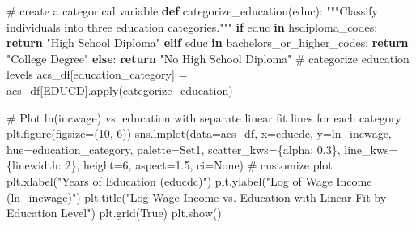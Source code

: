 \documentclass[
  letterpaper,
  DIV=11,
  numbers=noendperiod]{scrartcl}
\newenvironment{Shaded}{\begin{snugshade}}{\end{snugshade}}
\newcommand{\BuiltInTok}[1]{\textcolor[rgb]{0.00,0.23,0.31}{#1}}
\newcommand{\CommentTok}[1]{\textcolor[rgb]{0.37,0.37,0.37}{#1}}
\newcommand{\ControlFlowTok}[1]{\textcolor[rgb]{0.00,0.23,0.31}{\textbf{#1}}}
\newcommand{\DecValTok}[1]{\textcolor[rgb]{0.68,0.00,0.00}{#1}}
\newcommand{\FloatTok}[1]{\textcolor[rgb]{0.68,0.00,0.00}{#1}}
\newcommand{\KeywordTok}[1]{\textcolor[rgb]{0.00,0.23,0.31}{\textbf{#1}}}
\newcommand{\NormalTok}[1]{\textcolor[rgb]{0.00,0.23,0.31}{#1}}
\newcommand{\OperatorTok}[1]{\textcolor[rgb]{0.37,0.37,0.37}{#1}}
\newcommand{\StringTok}[1]{\textcolor[rgb]{0.13,0.47,0.30}{#1}}
\newcommand{\VariableTok}[1]{\textcolor[rgb]{0.07,0.07,0.07}{#1}}
\begin{document}
\begin{Shaded}
\begin{Highlighting}[]
\CommentTok{\# create a categorical variable}
\KeywordTok{def}\NormalTok{ categorize\_education(educ):}
    \CommentTok{"""Classify individuals into three education categories."""}
    \ControlFlowTok{if}\NormalTok{ educ }\KeywordTok{in}\NormalTok{ hsdiploma\_codes:}
        \ControlFlowTok{return} \StringTok{"High School Diploma"}
    \ControlFlowTok{elif}\NormalTok{ educ }\KeywordTok{in}\NormalTok{ bachelors\_or\_higher\_codes:}
        \ControlFlowTok{return} \StringTok{"College Degree"}
    \ControlFlowTok{else}\NormalTok{:}
        \ControlFlowTok{return} \StringTok{"No High School Diploma"}
\CommentTok{\# categorize education levels}
\NormalTok{acs\_df[}\StringTok{\textquotesingle{}education\_category\textquotesingle{}}\NormalTok{] }\OperatorTok{=}\NormalTok{ acs\_df[}\StringTok{\textquotesingle{}EDUCD\textquotesingle{}}\NormalTok{].}\BuiltInTok{apply}\NormalTok{(categorize\_education)}

\CommentTok{\# Plot ln(incwage) vs. education with separate linear fit lines for each category}
\NormalTok{plt.figure(figsize}\OperatorTok{=}\NormalTok{(}\DecValTok{10}\NormalTok{, }\DecValTok{6}\NormalTok{))}
\NormalTok{sns.lmplot(data}\OperatorTok{=}\NormalTok{acs\_df, x}\OperatorTok{=}\StringTok{\textquotesingle{}educdc\textquotesingle{}}\NormalTok{, y}\OperatorTok{=}\StringTok{\textquotesingle{}ln\_incwage\textquotesingle{}}\NormalTok{, hue}\OperatorTok{=}\StringTok{\textquotesingle{}education\_category\textquotesingle{}}\NormalTok{, }
\NormalTok{           palette}\OperatorTok{=}\StringTok{\textquotesingle{}Set1\textquotesingle{}}\NormalTok{, scatter\_kws}\OperatorTok{=}\NormalTok{\{}\StringTok{\textquotesingle{}alpha\textquotesingle{}}\NormalTok{: }\FloatTok{0.3}\NormalTok{\}, line\_kws}\OperatorTok{=}\NormalTok{\{}\StringTok{\textquotesingle{}linewidth\textquotesingle{}}\NormalTok{: }\DecValTok{2}\NormalTok{\}, height}\OperatorTok{=}\DecValTok{6}\NormalTok{, aspect}\OperatorTok{=}\FloatTok{1.5}\NormalTok{, ci}\OperatorTok{=}\VariableTok{None}\NormalTok{)}
\CommentTok{\# customize plot }
\NormalTok{plt.xlabel(}\StringTok{"Years of Education (educdc)"}\NormalTok{)}
\NormalTok{plt.ylabel(}\StringTok{"Log of Wage Income (ln\_incwage)"}\NormalTok{)}
\NormalTok{plt.title(}\StringTok{"Log Wage Income vs. Education with Linear Fit by Education Level"}\NormalTok{)}
\NormalTok{plt.grid(}\VariableTok{True}\NormalTok{)}
\NormalTok{plt.show()}
\end{Highlighting}
\end{Shaded}
\end{document}
